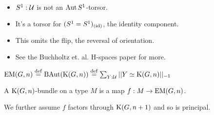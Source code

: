 \documentclass[14pt,aspectratio=169]{beamer}
\renewcommand{\defemph}[1]{\alert{#1}}
\begin{document}
\begin{frame}
\begin{itemize}
\item \( S^1:\mathcal{U} \) is not an \( \operatorname{Aut} S^1 \)-torsor.
\item It's a torsor for \( (S^1=S^1)_{(\text{id})} \), the identity component.
\item This omits the flip, the reversal of \alert{orientation}.
\item See the Buchholtz et. al. H-spaces paper for more.
\end{itemize}
\end{frame}

\begin{frame}
\begin{definition}
\( \mathrm{EM}(G,n)\stackrel{\mathrm{def}}{=} \operatorname{BAut}(\mathrm{K}(G,n))\stackrel{\mathrm{def}}{=} \sum_{Y:\mathcal{U}}||Y\simeq \mathrm{K}(G,n)||_{-1} \)
\end{definition}
\begin{definition}
A \defemph{\( \mathrm{K}(G,n) \)-bundle} on a type \( M \) is a map \( f:M\to \mathrm{EM}(G,n) \).
\end{definition}
We further assume \( f \) factors through \( \mathrm{K}(G,n+1) \) and so is principal.
\end{frame}
\end{document}
